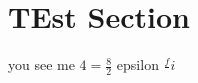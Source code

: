 \documentclass[twocolumn,10pt]{article}
\begin{document}
  \section{TEst Section}
  you see me
  $4=\frac{8}{2}$
   epsilon
  $\frac{f}{} i$
\end{document}
